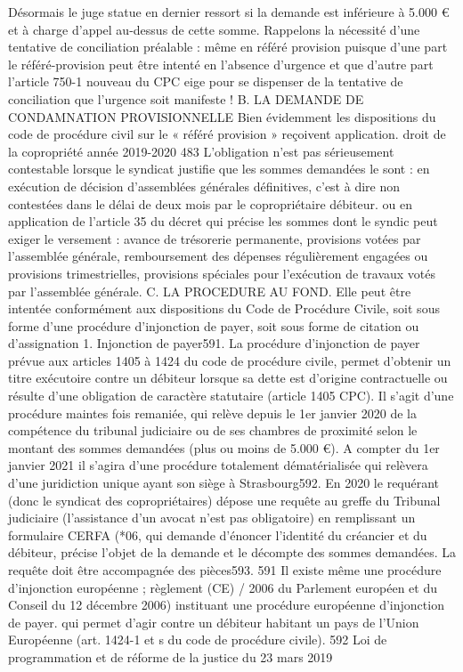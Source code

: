 Désormais le juge statue en dernier ressort si la demande est inférieure à 5.000 € et à charge d’appel au-dessus de cette somme.
Rappelons la nécessité d’une tentative de conciliation préalable : même en référé provision puisque d’une part le référé-provision peut être intenté en l’absence d’urgence et que d’autre part l’article 750-1 nouveau du CPC eige pour se dispenser de la tentative de conciliation que l’urgence soit manifeste !
B. LA DEMANDE DE CONDAMNATION PROVISIONNELLE
Bien évidemment les dispositions du code de procédure civil sur le « référé provision » reçoivent application.
droit de la copropriété année 2019-2020
483
L'obligation n'est pas sérieusement contestable lorsque le syndicat justifie que les sommes demandées le sont :
en exécution de décision d'assemblées générales définitives, c'est à dire non contestées dans le délai de deux mois par le copropriétaire débiteur.
ou en application de l'article 35 du décret qui précise les sommes dont le syndic peut exiger le versement : avance de trésorerie permanente, provisions votées par l'assemblée générale, remboursement des dépenses régulièrement engagées ou provisions trimestrielles, provisions spéciales pour l'exécution de travaux votés par l'assemblée générale.
C. LA PROCEDURE AU FOND.
Elle peut être intentée conformément aux dispositions du Code de Procédure Civile, soit sous forme d’une procédure d’injonction de payer, soit sous forme de citation ou d’assignation
1. Injonction de payer591.
La procédure d’injonction de payer prévue aux articles 1405 à 1424 du code de procédure civile, permet d’obtenir un titre exécutoire contre un débiteur lorsque sa dette est d’origine contractuelle ou résulte d’une obligation de caractère statutaire (article 1405 CPC).
Il s’agit d’une procédure maintes fois remaniée, qui relève depuis le 1er janvier 2020 de la compétence du tribunal judiciaire ou de ses chambres de proximité selon le montant des sommes demandées (plus ou moins de 5.000 €).
A compter du 1er janvier 2021 il s’agira d’une procédure totalement dématérialisée qui relèvera d’une juridiction unique ayant son siège à Strasbourg592.
En 2020 le requérant (donc le syndicat des copropriétaires) dépose une requête au greffe du Tribunal judiciaire (l’assistance d’un avocat n’est pas obligatoire) en remplissant un formulaire CERFA (*06, qui demande d’énoncer l’identité du créancier et du débiteur, précise l’objet de la demande et le décompte des sommes demandées. La requête doit être accompagnée des pièces593.
591 Il existe même une procédure d’injonction européenne ; règlement (CE)  / 2006 du Parlement européen et du Conseil du 12 décembre 2006) instituant une procédure européenne d'injonction de payer. qui permet d’agir contre un débiteur habitant un pays de l’Union Européenne (art. 1424-1 et s du code de procédure civile). 592 Loi de programmation et de réforme de la justice du 23 mars 2019

